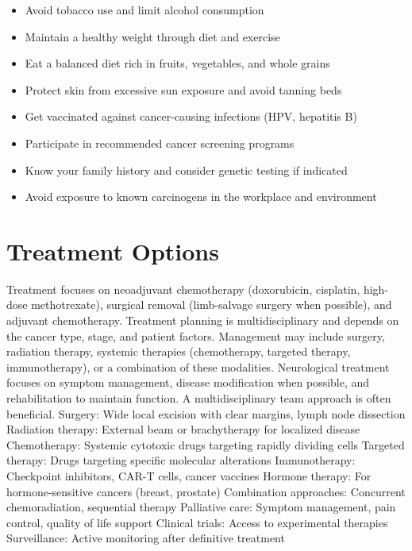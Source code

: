 \begin{itemize}[noitemsep]
  \item Avoid tobacco use and limit alcohol consumption
  \item Maintain a healthy weight through diet and exercise
  \item Eat a balanced diet rich in fruits, vegetables, and whole grains
  \item Protect skin from excessive sun exposure and avoid tanning beds
  \item Get vaccinated against cancer-causing infections (HPV, hepatitis B)
  \item Participate in recommended cancer screening programs
  \item Know your family history and consider genetic testing if indicated
  \item Avoid exposure to known carcinogens in the workplace and environment
\end{itemize}
\section{Treatment Options}
Treatment focuses on neoadjuvant chemotherapy (doxorubicin, cisplatin, high-dose methotrexate), surgical removal (limb-salvage surgery when possible), and adjuvant chemotherapy. Treatment planning is multidisciplinary and depends on the cancer type, stage, and patient factors. Management may include surgery, radiation therapy, systemic therapies (chemotherapy, targeted therapy, immunotherapy), or a combination of these modalities. Neurological treatment focuses on symptom management, disease modification when possible, and rehabilitation to maintain function. A multidisciplinary team approach is often beneficial. Surgery: Wide local excision with clear margins, lymph node dissection Radiation therapy: External beam or brachytherapy for localized disease Chemotherapy: Systemic cytotoxic drugs targeting rapidly dividing cells Targeted therapy: Drugs targeting specific molecular alterations Immunotherapy: Checkpoint inhibitors, CAR-T cells, cancer vaccines Hormone therapy: For hormone-sensitive cancers (breast, prostate) Combination approaches: Concurrent chemoradiation, sequential therapy Palliative care: Symptom management, pain control, quality of life support Clinical trials: Access to experimental therapies Surveillance: Active monitoring after definitive treatment

